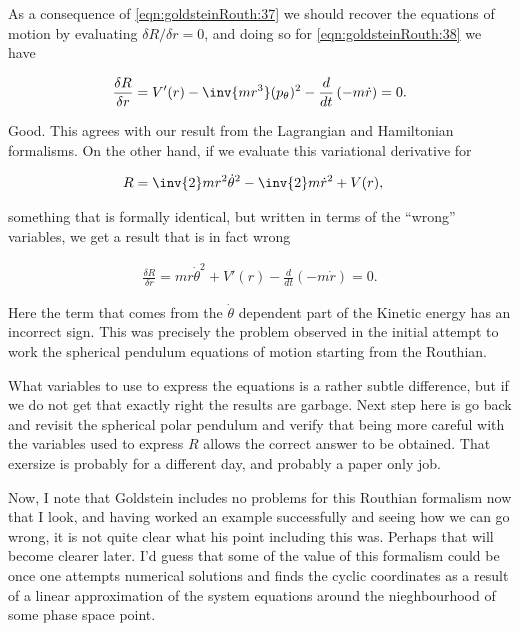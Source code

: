As a consequence of \ref{eqn:goldsteinRouth:37} we should recover the equations of motion by evaluating $\delta R/\delta r = 0$, and doing so for \ref{eqn:goldsteinRouth:38} we have

\begin{align}\label{eqn:goldsteinRouth:39}
\frac{\delta R}{\delta r} = V'(r) - \inv{m r^3} (p_\theta)^2 - \frac{d}{dt}\left( -m \dot{r} \right) = 0.
\end{align}

Good.  This agrees with our result from the Lagrangian and Hamiltonian formalisms.  On the other hand, if we evaluate this variational derivative for 

\begin{align}\label{eqn:goldsteinRouth:40}
R &= \inv{2} m r^2 \dot{\theta}^2 - \inv{2} m \dot{r}^2 + V(r),
\end{align}

something that is formally identical, but written in terms of the ``wrong'' variables, we get a result that is in fact wrong

\begin{align}\label{eqn:goldsteinRouth:39}
\frac{\delta R}{\delta r} = m r \dot{\theta}^2 + V'(r) - \frac{d}{dt}\left( -m \dot{r} \right) = 0.
\end{align}

Here the term that comes from the $\dot{\theta}$ dependent part of the Kinetic energy has an incorrect sign.  This was precisely the problem observed in the initial attempt to work the spherical pendulum equations of motion starting from the Routhian.

What variables to use to express the equations is a rather subtle difference, but if we do not get that exactly right the results are garbage.  Next step here is go back and revisit the spherical polar pendulum and verify that being more careful with the variables used to express $R$ allows the correct answer to be obtained.  That exersize is probably for a different day, and probably a paper only job.

Now, I note that Goldstein includes no problems for this Routhian formalism now that I look, and having worked an example successfully and seeing how we can go wrong, it is not quite clear what his point including this was.  Perhaps that will become clearer later.  I'd guess that some of the value of this formalism could be once one attempts numerical solutions and finds the cyclic coordinates as a result of a linear approximation of the system equations around the nieghbourhood of some phase space point.

\EndArticle
